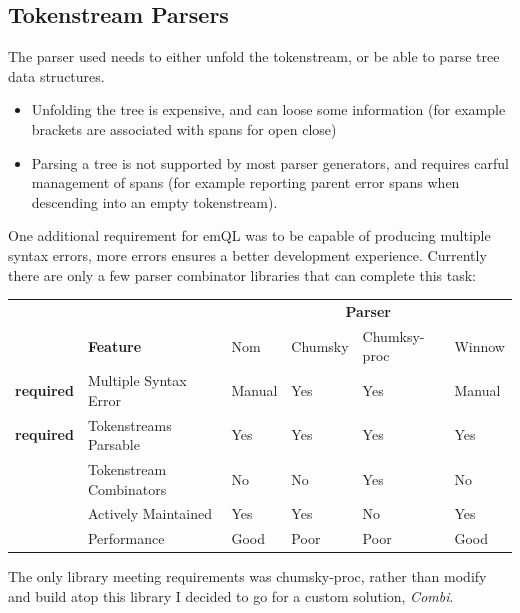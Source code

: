 \subsection{Tokenstream Parsers}
The parser used needs to either unfold the tokenstream, or be able to parse tree data structures.
\begin{itemize}
    \setlength\itemsep{0em}
    \item Unfolding the tree is expensive, and can loose some information (for example brackets are associated with spans for open close)
    \item Parsing a tree is not supported by most parser generators, and requires carful management of spans (for example reporting parent error spans when descending into an empty tokenstream).
\end{itemize}
One additional requirement for emQL was to be capable of producing multiple syntax errors, more errors ensures a better development experience. Currently there are only a few parser combinator libraries that can complete this task:
\begin{center}
    \begin{tabular}{l l | l l l l }
                          &                         & \multicolumn{4}{c}{\textbf{Parser}}                                   \\
                          & \textbf{Feature}        & Nom                                 & Chumsky & Chumksy-proc & Winnow \\
        \hline
        \textbf{required} & Multiple Syntax Error   & Manual                              & Yes     & Yes          & Manual \\
        \textbf{required} & Tokenstreams Parsable   & Yes                                 & Yes     & Yes          & Yes    \\
                          & Tokenstream Combinators & No                                  & No      & Yes          & No     \\
                          & Actively Maintained     & Yes                                 & Yes     & No           & Yes    \\
                          & Performance             & Good                                & Poor    & Poor         & Good   \\
    \end{tabular}
\end{center}
\noindent
The only library meeting requirements was chumsky-proc, rather than modify and build atop this library I decided to go for a custom solution, \textit{Combi}.

